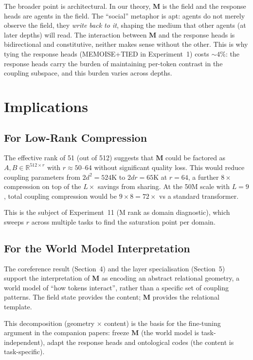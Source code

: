 \documentclass[11pt, a4paper]{article}
\newcommand{\M}{\mathbf{M}}
\newcommand{\R}{\mathbb{R}}
\theoremstyle{plain}
\theoremstyle{remark}
\begin{document}
The broader point is architectural.
In our theory, $\M$ is the field and the response heads are agents in the field.
The ``social'' metaphor is apt: agents do not merely observe the field, they \emph{write back to it}, shaping the medium that other agents (at later depths) will read.
The interaction between $\M$ and the response heads is bidirectional and constitutive, neither makes sense without the other.
This is why tying the response heads (MEMOISE+TIED in Experiment~1) costs ${\sim}4\%$: the response heads carry the burden of maintaining per-token contrast in the coupling subspace, and this burden varies across depths.

\section{Implications}

\subsection{For Low-Rank Compression}

The effective rank of 51 (out of 512) suggests that $\M$ could be factored as $A, B \in \R^{512 \times r}$ with $r \approx 50$--$64$ without significant quality loss.
This would reduce coupling parameters from $2d^2 = 524$K to $2dr = 65$K at $r = 64$, a further $8\times$ compression on top of the $L\times$ savings from sharing.
At the 50M scale with $L = 9$, total coupling compression would be $9 \times 8 = 72\times$ vs a standard transformer.

This is the subject of Experiment~11 (M rank as domain diagnostic), which sweeps $r$ across multiple tasks to find the saturation point per domain.

\subsection{For the World Model Interpretation}

The coreference result (Section~4) and the layer specialisation (Section~5) support the interpretation of $\M$ as encoding an abstract relational geometry, a world model of ``how tokens interact'', rather than a specific set of coupling patterns.
The field state provides the content; $\M$ provides the relational template.

This decomposition (geometry $\times$ content) is the basis for the fine-tuning argument in the companion papers: freeze $\M$ (the world model is task-independent), adapt the response heads and ontological codes (the content is task-specific).
\end{document}
